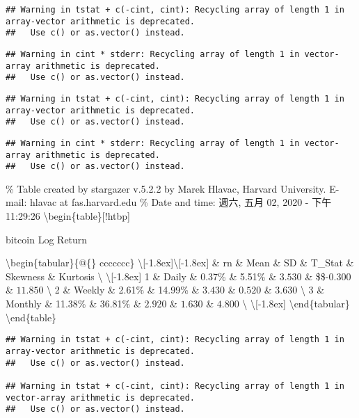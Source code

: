 \documentclass[
]{article}
\begin{document}
\begin{verbatim}
## Warning in tstat + c(-cint, cint): Recycling array of length 1 in array-vector arithmetic is deprecated.
##   Use c() or as.vector() instead.
\end{verbatim}

\begin{verbatim}
## Warning in cint * stderr: Recycling array of length 1 in vector-array arithmetic is deprecated.
##   Use c() or as.vector() instead.
\end{verbatim}

\begin{verbatim}
## Warning in tstat + c(-cint, cint): Recycling array of length 1 in array-vector arithmetic is deprecated.
##   Use c() or as.vector() instead.
\end{verbatim}

\begin{verbatim}
## Warning in cint * stderr: Recycling array of length 1 in vector-array arithmetic is deprecated.
##   Use c() or as.vector() instead.
\end{verbatim}

\% Table created by stargazer v.5.2.2 by Marek Hlavac, Harvard
University. E-mail: hlavac at fas.harvard.edu \% Date and time: 週六,
五月 02, 2020 - 下午 11:29:26 \textbackslash begin\{table\}{[}!htbp{]}
\centering 

\caption{bitcoin Log Return} 
  \label{}

\textbackslash begin\{tabular\}\{@\{\extracolsep{5pt}\} ccccccc\}
\textbackslash{[}-1.8ex{]}\hline  \hline \textbackslash{[}-1.8ex{]} \&
rn \& Mean \& SD \& T\_Stat \& Skewness \& Kurtosis \textbackslash{}
\hline \textbackslash{[}-1.8ex{]} 1 \& Daily \& 0.37\% \& 5.51\% \&
\(3.530\) \& \$\$-\(0.300\) \& \(11.850\) \textbackslash{} 2 \& Weekly
\& 2.61\% \& 14.99\% \& \(3.430\) \& \(0.520\) \& \(3.630\)
\textbackslash{} 3 \& Monthly \& 11.38\% \& 36.81\% \& \(2.920\) \&
\(1.630\) \& \(4.800\) \textbackslash{}
\hline \textbackslash{[}-1.8ex{]} \textbackslash end\{tabular\}
\textbackslash end\{table\}

\begin{verbatim}
## Warning in tstat + c(-cint, cint): Recycling array of length 1 in array-vector arithmetic is deprecated.
##   Use c() or as.vector() instead.

## Warning in tstat + c(-cint, cint): Recycling array of length 1 in vector-array arithmetic is deprecated.
##   Use c() or as.vector() instead.
\end{verbatim}
\end{document}
